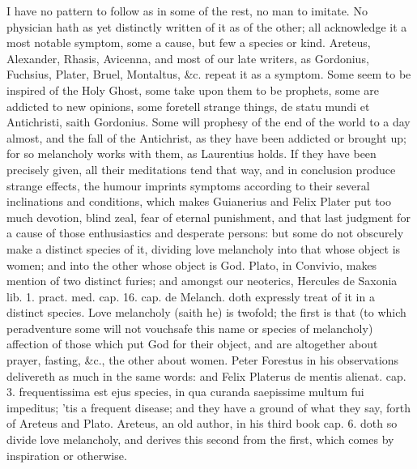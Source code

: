 {I have no pattern to follow as in some of the rest, no man to imitate.
No physician hath as yet distinctly written of it as of the other; all
acknowledge it a most notable symptom, some a cause, but few a species
or kind. Areteus, Alexander, Rhasis, Avicenna, and most of our
late writers, as Gordonius, Fuchsius, Plater, Bruel, Montaltus, \&c.
repeat it as a symptom. Some seem to be inspired of the Holy
Ghost, some take upon them to be prophets, some are addicted to new
opinions, some foretell strange things, de statu mundi et Antichristi,
saith Gordonius. Some will prophesy of the end of the world to a day
almost, and the fall of the Antichrist, as they have been addicted or
brought up; for so melancholy works with them, as Laurentius
holds. If they have been precisely given, all their meditations tend
that way, and in conclusion produce strange effects, the humour
imprints symptoms according to their several inclinations and
conditions, which makes Guianerius and Felix Plater put too
much devotion, blind zeal, fear of eternal punishment, and that last
judgment for a cause of those enthusiastics and desperate persons: but
some do not obscurely make a distinct species of it, dividing love
melancholy into that whose object is women; and into the other whose
object is God. Plato, in Convivio, makes mention of two distinct
furies; and amongst our neoterics, Hercules de Saxonia lib. 1. pract.
med. cap. 16. cap. de Melanch. doth expressly treat of it in a distinct
species.  Love melancholy (saith he) is twofold; the first is
that (to which peradventure some will not vouchsafe this name or
species of melancholy) affection of those which put God for their
object, and are altogether about prayer, fasting, \&c., the other about
women. Peter Forestus in his observations delivereth as much in the
same words: and Felix Platerus de mentis alienat. cap. 3.
frequentissima est ejus species, in qua curanda saepissime multum fui
impeditus; 'tis a frequent disease; and they have a ground of what they
say, forth of Areteus and Plato. Areteus, an old author, in his
third book cap. 6. doth so divide love melancholy, and derives this
second from the first, which comes by inspiration or otherwise.

}
